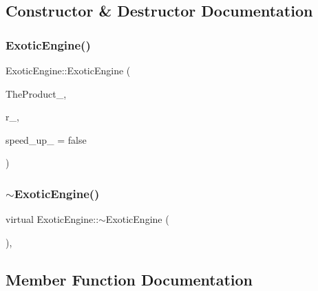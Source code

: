 \subsection{Constructor \& Destructor Documentation}
\hypertarget{classExoticEngine_a8f2b07aae083e53933b539a9e36df536}{}\label{classExoticEngine_a8f2b07aae083e53933b539a9e36df536} 
\subsubsection{\texorpdfstring{Exotic\+Engine()}{ExoticEngine()}}
{\footnotesize\ttfamily Exotic\+Engine\+::\+Exotic\+Engine (\begin{DoxyParamCaption}\item[{const \hyperlink{classWrapper}{Wrapper}$<$ \hyperlink{classPathDependent}{Path\+Dependent} $>$ \&}]{The\+Product\+\_\+,  }\item[{const \hyperlink{classParameters}{Parameters} \&}]{r\+\_\+,  }\item[{bool}]{speed\+\_\+up\+\_\+ = {\ttfamily false} }\end{DoxyParamCaption})}

\hypertarget{classExoticEngine_a9ca6c7fadc943a9f00460ae6371bd6a2}{}\label{classExoticEngine_a9ca6c7fadc943a9f00460ae6371bd6a2} 
\subsubsection{\texorpdfstring{$\sim$\+Exotic\+Engine()}{~ExoticEngine()}}
{\footnotesize\ttfamily virtual Exotic\+Engine\+::$\sim$\+Exotic\+Engine (\begin{DoxyParamCaption}{ }\end{DoxyParamCaption})\hspace{0.3cm}{\ttfamily [inline]}, {\ttfamily [virtual]}}



\subsection{Member Function Documentation}
\hypertarget{classExoticEngine_ac52ddfbb69f3bd1aa2f87114406e1725}{}\label{classExoticEngine_ac52ddfbb69f3bd1aa2f87114406e1725} 
